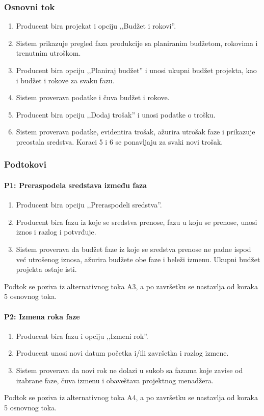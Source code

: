 \subsubsection*{Osnovni tok}
\begin{enumerate}
    \item Producent bira projekat i opciju ,,Budžet i rokovi''.
    \item Sistem prikazuje pregled faza produkcije sa planiranim budžetom, rokovima i trenutnim utroškom.
    \item Producent bira opciju ,,Planiraj budžet'' i unosi ukupni budžet projekta, kao i budžet i rokove za svaku fazu.
    \item Sistem proverava podatke i čuva budžet i rokove.
    \item Producent bira opciju ,,Dodaj trošak'' i unosi podatke o trošku.
    \item Sistem proverava podatke, evidentira trošak, ažurira utrošak faze i prikazuje preostala sredstva. Koraci 5 i 6 se ponavljaju za svaki novi trošak.
\end{enumerate}

\subsubsection*{Podtokovi}

\paragraph*{P1: Preraspodela sredstava između faza}
\begin{enumerate}
    \item Producent bira opciju ,,Preraspodeli sredstva''.
    \item Producent bira fazu iz koje se sredstva prenose, fazu u koju se prenose, unosi iznos i razlog i potvrđuje.
    \item Sistem proverava da budžet faze iz koje se sredstva prenose ne padne ispod već utrošenog iznosa, ažurira budžete obe faze i beleži izmenu. Ukupni budžet projekta ostaje isti.
\end{enumerate}
Podtok se poziva iz alternativnog toka A3, a po završetku se nastavlja od koraka 5 osnovnog toka.

\paragraph*{P2: Izmena roka faze}
\begin{enumerate}
    \item Producent bira fazu i opciju ,,Izmeni rok''.
    \item Producent unosi novi datum početka i/ili završetka i razlog izmene.
    \item Sistem proverava da novi rok ne dolazi u sukob sa fazama koje zavise od izabrane faze, čuva izmenu i obaveštava projektnog menadžera.
\end{enumerate}
Podtok se poziva iz alternativnog toka A4, a po završetku se nastavlja od koraka 5 osnovnog toka.

